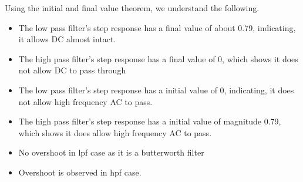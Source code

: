 \documentclass[11pt, a4paper]{article}
\begin{document}
{

Using the initial and final value theorem, we understand the following.
\begin{itemize}
    \item The low pass filter's step response has a final value of about 0.79, indicating, it allows DC almost intact.
    \item The high pass filter's step response has a final value of 0, which shows it does not allow DC to pass through
    \item The low pass filter's step response has a initial value of 0, indicating, it does not allow high frequency AC to pass.
    \item The high pass filter's step response has a initial value of magnitude 0.79, which shows it does  allow high frequency AC to pass. 

    \item No overshoot in lpf case as it is a butterworth filter
    \item Overshoot is observed in hpf case.
\end{itemize}
}
\end{document}
